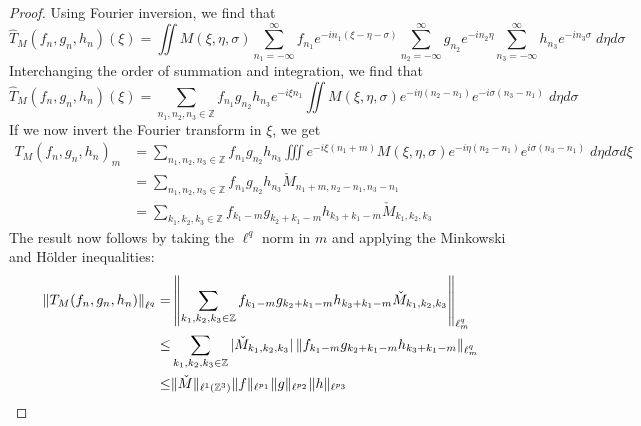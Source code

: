 \documentclass[letterpaper, reqno,final]{amsart}
\newcommand{\bbZ}{\mathbb{Z}}
\begin{document}
\begin{proof}
    Using Fourier inversion, we find that
    \begin{equation}
        \widehat{T}_M(f_n,g_n,h_n)(\xi) = \iint M(\xi, \eta, \sigma) \sum_{n_1=-\infty}^\infty f_{n_1} e^{-in_1(\xi - \eta - \sigma)}\sum_{n_2=-\infty}^\infty  g_{n_2} e^{-in_2\eta}\sum_{n_3=-\infty}^\infty  h_{n_3}e^{-in_3\sigma}\;d\eta d\sigma
    \end{equation}
    Interchanging the order of summation and integration, we find that
    \begin{equation}
        \widehat{T}_M(f_n,g_n,h_n)(\xi) = \sum_{n_1, n_2, n_3 \in \bbZ} f_{n_1}g_{n_2}h_{n_3} e^{-i\xi n_1} \iint M(\xi, \eta, \sigma)e^{-i\eta(n_2 - n_1)} e^{-i\sigma(n_3 - n_1)} \;d\eta d\sigma
    \end{equation}
    If we now invert the Fourier transform in $\xi$, we get
    \begin{equation}\label{eqn:pseudoprod-phys-def}\begin{split}
        T_M(f_n,g_n,h_n)_m &= \sum_{n_1, n_2, n_3 \in \bbZ} f_{n_1}g_{n_2}h_{n_3}  \iiint e^{-i\xi (n_1 + m)} M(\xi, \eta, \sigma)e^{-i\eta(n_2 - n_1)} e^{i\sigma(n_3 - n_1)} \;d\eta d\sigma d\xi \\
        &= \sum_{n_1, n_2, n_3 \in \bbZ} f_{n_1}g_{n_2}h_{n_3} \check{M}_{n_1 + m, n_2 - n_1, n_3 - n_1}\\
        &= \sum_{k_1, k_2, k_3 \in \bbZ} f_{k_1 - m}g_{k_2 + k_1 - m}h_{k_3 + k_1 - m} \check{M}_{k_1, k_2, k_3}
    \end{split}\end{equation}
    The result now follows by taking the $\ell^q$ norm in $m$ and applying the Minkowski and H\"{o}lder inequalities:
    \begin{align*}
        \left\lVert T_M(f_n,g_n,h_n) \right\rVert_{\ell^q} =& \left\lVert \sum_{k_1, k_2, k_3 \in \bbZ} f_{k_1 - m}g_{k_2 + k_1 - m}h_{k_3 + k_1 - m} \check{M}_{k_1, k_2, k_3} \right\rVert_{\ell^q_m}\\
        \leq& \sum_{k_1, k_2, k_3 \in \bbZ} |\check{M}_{k_1, k_2, k_3}| \left\lVert f_{k_1 - m}g_{k_2 + k_1 - m}h_{k_3 + k_1 - m}  \right\rVert_{\ell^q_m}\\
        \leq& \lVert \check{M} \rVert_{\ell^1(\bbZ^3)} \lVert f \rVert_{\ell^{p_1}} \lVert g \rVert_{\ell^{p_2}}\lVert h \rVert_{\ell^{p_3}}\qedhere
    \end{align*}
\end{proof}
\end{document}
